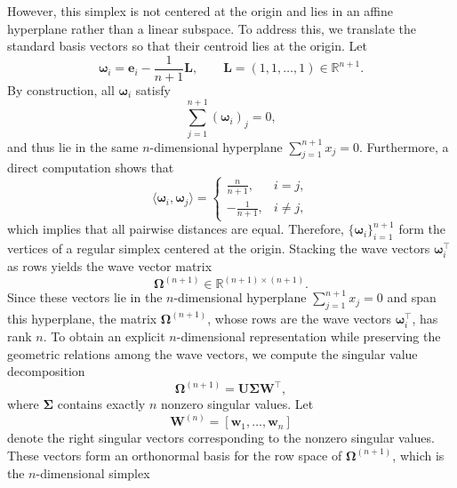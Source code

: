 \documentclass{article}
\theoremstyle{plain}
\theoremstyle{definition}
\theoremstyle{remark}
\begin{document}
However, this simplex is not centered at the origin and lies in an affine
hyperplane rather than a linear subspace. To address this, we translate the
standard basis vectors so that their centroid lies at the origin. Let
\begin{equation}
\boldsymbol{\omega}_i = \mathbf{e}_i - \frac{1}{n+1}\mathbf{L}, \qquad
\mathbf{L} = (1,1,\dots,1)\in\mathbb{R}^{n+1}.
\end{equation}
By construction, all $\boldsymbol{\omega}_i$ satisfy
\begin{equation}
\sum_{j=1}^{n+1} (\boldsymbol{\omega}_i)_j = 0,
\end{equation}
and thus lie in the same \(n\)-dimensional hyperplane
\(\sum_{j=1}^{n+1}x_j=0\). Furthermore, a direct computation shows that
\begin{equation}
\langle \boldsymbol{\omega}_i, \boldsymbol{\omega}_j \rangle =
\begin{cases}
\frac{n}{n+1}, & i=j, \\
-\frac{1}{n+1}, & i\neq j,
\end{cases}
\end{equation}
which implies that all pairwise distances are equal. Therefore, $\{\boldsymbol{\omega}_i\}_{i=1}^{n+1}$ form the vertices of a regular simplex centered at the origin. Stacking the wave vectors $\boldsymbol{\omega}_i^\top$ as rows yields the wave vector matrix
\begin{equation}
\boldsymbol{\Omega}^{(n+1)} \in \mathbb{R}^{(n+1)\times(n+1)}.
\end{equation}
Since these vectors lie in the \(n\)-dimensional hyperplane
\(\sum_{j=1}^{n+1}x_j=0\) and span this hyperplane, the matrix
\(\boldsymbol{\Omega}^{(n+1)}\), whose rows are the wave vectors
\(\boldsymbol{\omega}_i^\top\), has rank \(n\). To obtain an
explicit \(n\)-dimensional representation while preserving the geometric
relations among the wave vectors, we compute the singular value decomposition
\begin{equation}
\boldsymbol{\Omega}^{(n+1)}
=
\mathbf U\boldsymbol{\Sigma}\mathbf W^\top ,
\end{equation}
where \(\boldsymbol{\Sigma}\) contains exactly \(n\) nonzero singular values.
Let
\begin{equation}
\mathbf W^{(n)}=[\mathbf w_1,\dots,\mathbf w_n]
\end{equation}
denote the right singular vectors corresponding to the nonzero singular values.
These vectors form an orthonormal basis for the row space of
\(\boldsymbol{\Omega}^{(n+1)}\), which is the \(n\)-dimensional simplex
\end{document}
